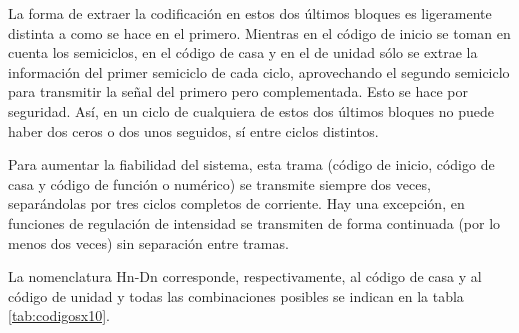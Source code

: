 La forma de extraer la codificación en estos dos últimos bloques
es ligeramente distinta a como se hace en el primero. Mientras en el
código de inicio se toman en cuenta los semiciclos, en el código de casa
y en el de unidad sólo se extrae la información del primer semiciclo de
cada ciclo, aprovechando el segundo semiciclo para transmitir la señal
del primero pero complementada. Esto se hace por seguridad. Así, en un
ciclo de cualquiera de estos dos últimos bloques no puede haber dos
ceros o dos unos seguidos, sí entre ciclos distintos.


Para aumentar la fiabilidad del sistema, esta trama (código de
inicio, código de casa y código de función o numérico) se transmite
siempre dos veces, separ\'andolas por tres ciclos completos de corriente.
Hay una excepción, en funciones de regulación de intensidad se
transmiten de forma continuada (por lo menos dos veces) sin separación
entre tramas.


La nomenclatura Hn-Dn corresponde, respectivamente, al código
de casa y al código de unidad y todas las combinaciones posibles se
indican en la tabla \ref{tab:codigosx10}.

